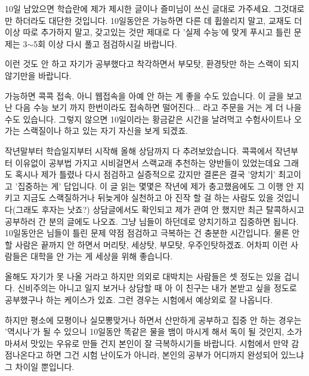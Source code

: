 10일 남았으면 학습란에 제가 제시한 글이나 즐미님이 쓰신 글대로 가주세요. 그것대로만 하더라도 대단한 것입니다.
10일동안은 가능하면 다른 데 휩쓸리지 말고, 교재도 더 이상 따로 추가하지 말고, 갖고있는 것만 제대로 다 '실제 수능'에 맞게 푸시고
틀린 문제는 3$\sim$5회 이상 다시 풀고 점검하시길 바랍니다.
\vspace{5mm}

이런 것도 안 하고 자기가 공부했다고 착각하면서 부모탓, 환경탓만 하는 스랙이 되지 않기만을 바랍니다.
\vspace{5mm}

가능하면 콕콕 접속, 아니 웹접속을 아예 안 하는 게 좋을 수도 있습니다.
이 글을 보고 난 다음 수능 보기 까지 한번이라도 접속하면 떨어진다... 라고 주문을 거는 게 더 나을 수도 있습니다.
그렇지 않으면 10일이라는 황금같은 시간을 날려먹고 수험사이트나 오가는 스랙질이나 하고 있는 자기 자신을 보게 되겠죠.
\vspace{5mm}

작년말부터 학습일지부터 시작해 올해 상담까지 다 추려보았습니다.
콕콕에서 작년부터 이유없이 공부법 가지고 시비걸면서 스랙교래 추천하는 양반들이 있었는데요
그래도 혹시나 제가 틀렸나 다시 점검하고 실증적으로 갔지만 결론은 결국 '양치기' 최고이고 '집중하는 게' 답입니다.
이 글 읽는 몇몇은 작년에 제가 충고했음에도 그 이행 안 지키고 지금도 스랙질하거나
뒤늦게야 실천하고 아 진작 할 걸 하는 사람도 있을 것입니다(그래도 후자는 낫죠?)
상담글에서도 확인되고 제가 관여 안 했지만 최근 탈콕하시고 공부하러 간 분의 글에도 나오죠.
그냥 님들이 하던데로 양치기하고 집중하면 됩니다.
10일동안은 님들이 틀린 문제 약점 점검하고 극복하는 건 충분한 시간입니다.
물론 안 할 사람은 끝까지 안 하면서 머리탓, 세상탓, 부모탓, 우주인탓하겠죠. 어차피 이런 사람들은 대학을 안 가는 게 세상을 위해 좋습니다.
\vspace{5mm}

올해도 자기가 못 나올 거라고 하지만 의외로 대박치는 사람들은 셋 정도는 있을 겁니다.
신비주의는 아니고 일지 보거나 상담할 때 아 이 친구는 내가 본받고 싶을 정도로 공부했구나 하는 케이스가 있죠.
그런 경우는 시험에서 예상외로 잘 나옵니다.
\vspace{5mm}

하지만 평소에 모평이나 실모뽕맞거나 하면서 산만하게 공부하고 집중 안 하는 경우는 '역시나'가 될 수 있으니
10일동안 똑같은 물을 뱀이 마시게 해서 독이 될 것인지, 소가 마셔서 맛있는 우유로 만들 건지 본인이 잘 극복하시기들 바랍니다.
시험에서 만약 감점나온다고 하면 그건 시험 난이도가 아니라, 본인의 공부가 어디까지 완성되어 있느냐 그 차이일 뿐입니다.
\vspace{5mm}

